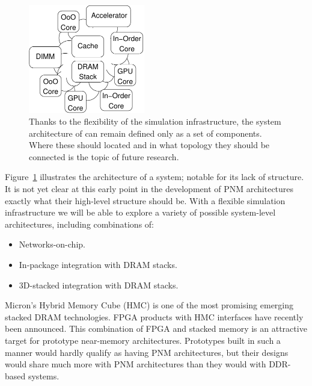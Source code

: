 \begin{figure}
  \centering
  \includegraphics[width=2in]{fig/arch}
  \caption{Thanks to the flexibility of the simulation infrastructure, the system architecture of \name can remain defined only as a set of components. Where these should located and in what topology they should be connected is the topic of future research.}
  \label{fig:arch}
\end{figure}

Figure~\ref{fig:arch} illustrates the architecture of a \name system; notable for its lack of structure.
It is not yet clear at this early point in the development of PNM architectures exactly what their high-level structure should be.
With a flexible simulation infrastructure we will be able to explore a variety of possible system-level architectures, including combinations of:
\begin{itemize}
  \item Networks-on-chip.
  \item In-package integration with DRAM stacks.
  \item 3D-stacked integration with DRAM stacks.
\end{itemize}

Micron's Hybrid Memory Cube (HMC) \cite{hmc} is one of the most promising emerging stacked DRAM technologies.
FPGA products with HMC interfaces have recently been announced. \cite{hmcfpga}
This combination of FPGA and stacked memory is an attractive target for prototype near-memory architectures.
Prototypes built in such a manner would hardly qualify as having PNM architectures, but their designs would share much more with PNM architectures than they would with DDR-based systems.
